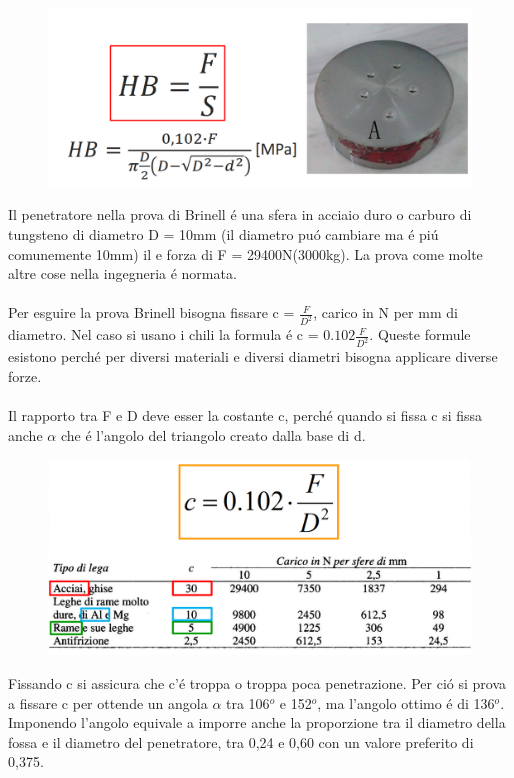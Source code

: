 \documentclass{article}
\begin{document}
{\begin{figure}[!h]
                        \centering
                        \includegraphics[width=.85\linewidth]{Equazione per Durezza Brinell.png}
                    \end{figure}
                    Il penetratore nella prova di Brinell \'e una sfera in acciaio duro o carburo di tungsteno di diametro D = 10mm (il diametro pu\'o cambiare ma \'e pi\'u comunemente 10mm) il e forza di F = 29400N(3000kg). La prova come molte altre cose nella ingegneria \'e normata.\\ \\
                    Per esguire la prova Brinell bisogna fissare c = $\frac{F}{D^2}$, carico in N per mm di diametro. Nel caso si usano i chili la formula \'e c = $0.102\frac{F}{D^2}$. Queste formule esistono perch\'e per diversi materiali e diversi diametri bisogna applicare diverse forze.\\ \\
                    Il rapporto tra F e D deve esser la costante c, perch\'e quando si fissa c si fissa anche $\alpha$ che \'e l'angolo del triangolo creato dalla base di d.
                    \begin{figure}[!h]
                        \centering
                        \includegraphics[width=.85\linewidth]{Tabella per Valore c Prova Brinell.png}
                    \end{figure}
                    Fissando c si assicura che c'\'e troppa o troppa poca penetrazione. Per ci\'o si prova a fissare c per ottende un angola $\alpha$ tra 106$^o$ e 152$^o$, ma l'angolo ottimo \'e di 136$^o$. Imponendo l'angolo equivale a imporre anche la proporzione tra il diametro della fossa e il diametro del penetratore, tra 0,24 e 0,60 con un valore preferito di 0,375.\\ \\
}
\end{document}
